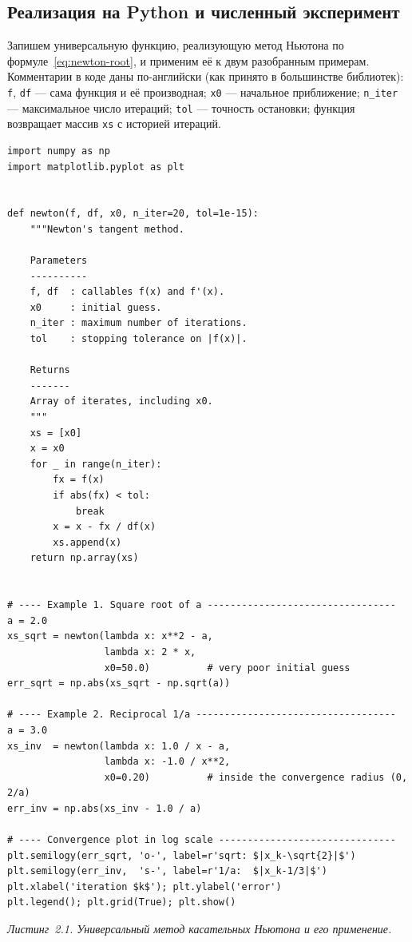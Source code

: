 \subsection{Реализация на Python и численный эксперимент}

Запишем универсальную функцию, реализующую метод Ньютона
по формуле~\eqref{eq:newton-root}, и применим её к двум разобранным
примерам. Комментарии в коде даны по-английски (как принято в
большинстве библиотек): \texttt{f}, \texttt{df} — сама функция и
её производная; \texttt{x0} — начальное приближение; \texttt{n\_iter} —
максимальное число итераций; \texttt{tol} — точность остановки;
функция возвращает массив \texttt{xs} с историей итераций.

\begin{lstlisting}[label={lst:newton}]
import numpy as np
import matplotlib.pyplot as plt


def newton(f, df, x0, n_iter=20, tol=1e-15):
    """Newton's tangent method.

    Parameters
    ----------
    f, df  : callables f(x) and f'(x).
    x0     : initial guess.
    n_iter : maximum number of iterations.
    tol    : stopping tolerance on |f(x)|.

    Returns
    -------
    Array of iterates, including x0.
    """
    xs = [x0]
    x = x0
    for _ in range(n_iter):
        fx = f(x)
        if abs(fx) < tol:
            break
        x = x - fx / df(x)
        xs.append(x)
    return np.array(xs)


# ---- Example 1. Square root of a ---------------------------------
a = 2.0
xs_sqrt = newton(lambda x: x**2 - a,
                 lambda x: 2 * x,
                 x0=50.0)          # very poor initial guess
err_sqrt = np.abs(xs_sqrt - np.sqrt(a))

# ---- Example 2. Reciprocal 1/a -----------------------------------
a = 3.0
xs_inv  = newton(lambda x: 1.0 / x - a,
                 lambda x: -1.0 / x**2,
                 x0=0.20)          # inside the convergence radius (0, 2/a)
err_inv = np.abs(xs_inv - 1.0 / a)

# ---- Convergence plot in log scale -------------------------------
plt.semilogy(err_sqrt, 'o-', label=r'sqrt: $|x_k-\sqrt{2}|$')
plt.semilogy(err_inv,  's-', label=r'1/a:  $|x_k-1/3|$')
plt.xlabel('iteration $k$'); plt.ylabel('error')
plt.legend(); plt.grid(True); plt.show()
\end{lstlisting}

\noindent\small\textit{Листинг~2.1. Универсальный метод касательных
Ньютона и его применение.}\normalsize

